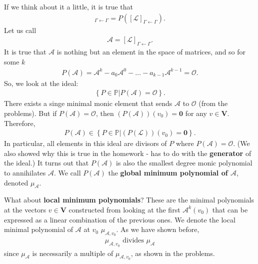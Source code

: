 \documentclass{book}
\theoremstyle{definition}
\newcommand{\V}{\mathbf{V}}
\newcommand{\A}{\mathcal{A}}
\newcommand{\lag}{\mathcal{L}}
\begin{document}
	If we think about it a little, it is true that
\begin{align*}
[P(\lag)]_{\Gamma\leftarrow\Gamma} = P\left([\lag]_{\Gamma\leftarrow\Gamma}\right).
\end{align*}
Let us call 
\begin{align*}
\mathcal{A} = [\lag]_{\Gamma\leftarrow\Gamma}.
\end{align*}
It is true that $\mathcal{A}$ is nothing but an element in the space of matrices, and so for some $k$
\begin{align*}
P(\A) = \A^k - a_0 \A^{0} - \dots - a_{k-1}\A^{k-1} = \mathcal{O}.
\end{align*}
So, we look at the ideal:
\begin{align*}
\left\{ P \in \mathbb{P} \bigg\vert P(\A) = \mathcal{O} \right\}.
\end{align*}
There exists a singe minimal monic element that sends $\A$ to $\mathcal{O}$ (from the problems). But if $P(\A) = \mathcal{O}$, then $(P(\A))(v_0) = \mathbf{0}$ for any $v\in \V$. Therefore,
\begin{align*}
P(\A) \in 
\left\{ 
P \in \mathbb{P} 
\bigg\vert
(P(\lag))(v_0) = \mathbf{0}  
\right\} .
\end{align*}
In particular, all elements in this ideal are divisors of $P$ where $P(\A) = \mathcal{O}$. (We also showed why this is true in the homework - has to do with the \textbf{generator} of the ideal.) It turns out that $P(\A)$ is also the smallest degree monic polynomial to annihilates $\A$. We call $P(\A)$ the \textbf{global minimum polynomial of $\A$}, denoted $\mu_\A$.

What about \textbf{local minimum polynomials}? These are the minimal polynomials at the vectors $v\in \V$ constructed from looking at the first $\A^k(v_0)$ that can be expressed as a linear combination of the previous ones. We denote the local minimal polynomial of $\A$ at $v_0$ $\mu_{\A,v_0}$. As we have shown before,
\begin{align*}
\boxed{\mu_{\A,v_0} \text{ divides } \mu_\A}
\end{align*}  
since $\mu_\A$ is necessarily a multiple of $\mu_{\A,v_0}$, as shown in the problems. \\
\end{document}
